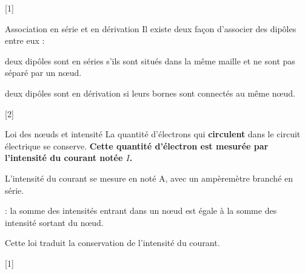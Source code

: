 [1]


\begin{doc}{Association en série et en dérivation}
  Il existe deux façon d'associer des dipôles entre eux :
  \begin{listePoints}
    \item deux dipôles sont en séries s'ils sont situés dans la même maille et ne sont pas séparé par un nœud.
    \item deux dipôles sont en dérivation si leurs bornes sont connectés au même nœud.
  \end{listePoints}
\end{doc}

\newpage
\vspace*{-28pt}
[2]


\begin{doc}{Loi des nœuds et intensité}
  \chevron La quantité d'électrons qui \textbf{circulent} dans le circuit électrique se conserve.
  \textbf{Cette quantité d'électron est mesurée par l'intensité du courant notée $I$.}
  \begin{importants}
    L'intensité du courant se mesure en  noté A, avec un ampèremètre branché en série.
  \end{importants}
  \begin{importants}
     : la somme des intensités entrant dans un nœud est égale à la somme des intensité sortant du nœud.
  \end{importants}
  Cette loi traduit la conservation de l'intensité du courant.
\end{doc}

[1]


